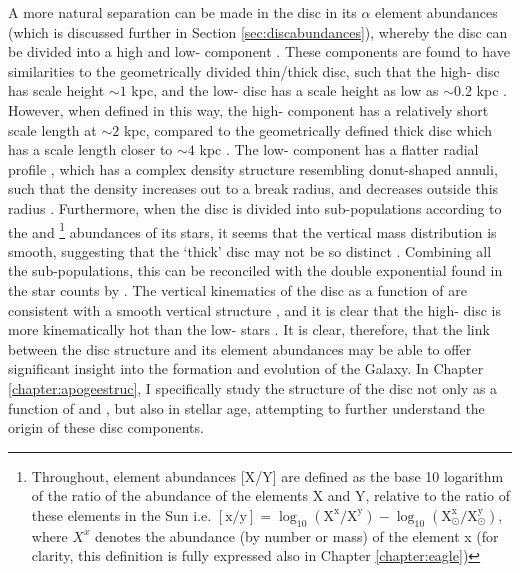 A more natural separation can be made in the disc in its $\alpha$ element abundances (which is discussed further in Section \ref{sec:discabundances}), whereby the disc can be divided into a high and low-\afe{} component \citep[e.g.][]{1998A&A...338..161F,2003A&A...410..527B,2005A&A...433..185B,2013A&A...560A.109H,2014A&A...562A..71B,2014A&A...564A.115A,2014ApJ...796...38N,2015ApJ...808..132H}. These components are found to have similarities to the geometrically divided thin/thick disc, such that the high-\afe{} disc has scale height $\sim 1$ kpc, and the low-\afe{} disc has a scale height as low as $\sim 0.2$ kpc \citep[e.g.][]{2012ApJ...753..148B,2016ApJ...823...30B}. However, when defined in this way, the high-\afe{} component has a relatively short scale length at $\sim 2$ kpc, compared to the geometrically defined thick disc which has a scale length closer to $\sim4$ kpc \citep{2008ApJ...673..864J}. The low-\afe{} component has a flatter radial profile \citep{2012ApJ...752...51C}, which has a complex density structure resembling donut-shaped annuli, such that the density increases out to a break radius, and decreases outside this radius \citep{2012ApJ...753..148B,2016ApJ...823...30B}. Furthermore, when the disc is divided into sub-populations according to the \afe{} and \feh{}\footnote{Throughout, element abundances [X/Y] are defined as the base 10 logarithm of the ratio of the abundance of the elements X and Y, relative to the ratio of these elements in the Sun i.e. $\mathrm{[x/y]} = \log_{10}(\mathrm{X^{x}/X^{y}})-\log_{10}(\mathrm{X^{x}_{\odot}/X^{y}_{\odot}})$, where $X^{x}$ denotes the abundance (by number or mass) of the element x (for clarity, this definition is fully expressed also in Chapter \ref{chapter:eagle})} abundances of its stars, it seems that the vertical mass distribution is smooth, suggesting that the `thick' disc may not be so distinct \citep{2012ApJ...751..131B}. Combining all the sub-populations, this can be reconciled with the double exponential found in the star counts by \citet{1983MNRAS.202.1025G} \citep[see][]{2013A&ARv..21...61R}. The vertical kinematics of the disc as a function of \afe{} are consistent with a smooth vertical structure \citep{2012ApJ...755..115B}, and it is clear that the high-\afe{} disc is more kinematically hot than the low-\afe{} stars \citep[e.g.][]{2005A&A...433..185B}. It is clear, therefore, that the link between the disc structure and its element abundances may be able to offer significant insight into the formation and evolution of the Galaxy. In Chapter \ref{chapter:apogeestruc}, I specifically study the structure of the disc not only as a function of \afe{} and \feh{}, but also in stellar age, attempting to further understand the origin of these disc components.

